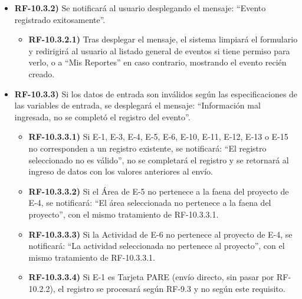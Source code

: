 \begin{itemize}[label={}, leftmargin=1.5em]
\begin{itemize}[label={}, leftmargin=1.5em]
\begin{itemize}[label={}, leftmargin=1.5em]
      \item \textbf{RF-10.3.1.1)} Si E-16 contiene archivos, el sistema invoca autom\'aticamente RF-12 (Registrar evidencias de evento), enviando el ID del evento creado, los archivos de E-16 y el origen \texttt{reporte}.
      \item \textbf{RF-10.3.1.2)} Si RF-12 notifica un fallo, el sistema revertir\'a la creaci\'on del evento (rollback), notificar\'a: ``No se pudo completar el registro, intente nuevamente'' y retornar\'a al ingreso de datos con los valores anteriores al env\'io.
    \end{itemize}
    \item \textbf{RF-10.3.2)} Se notificar\'a al usuario desplegando el mensaje: ``Evento registrado exitosamente''.
    \begin{itemize}[label={}, leftmargin=1.5em]
      \item \textbf{RF-10.3.2.1)} Tras desplegar el mensaje, el sistema limpiar\'a el formulario y redirigir\'a al usuario al listado general de eventos si tiene permiso para verlo, o a ``Mis Reportes'' en caso contrario, mostrando el evento reci\'en creado.
    \end{itemize}
    \item \textbf{RF-10.3.3)} Si los datos de entrada son inv\'alidos seg\'un las especificaciones de las variables de entrada, se desplegar\'a el mensaje: ``Informaci\'on mal ingresada, no se complet\'o el registro del evento''.
    \begin{itemize}[label={}, leftmargin=1.5em]
      \item \textbf{RF-10.3.3.1)} Si E-1, E-3, E-4, E-5, E-6, E-10, E-11, E-12, E-13 o E-15 no corresponden a un registro existente, se notificar\'a: ``El registro seleccionado no es v\'alido'', no se completar\'a el registro y se retornar\'a al ingreso de datos con los valores anteriores al env\'io.
      \item \textbf{RF-10.3.3.2)} Si el \'Area de E-5 no pertenece a la faena del proyecto de E-4, se notificar\'a: ``El \'area seleccionada no pertenece a la faena del proyecto'', con el mismo tratamiento de RF-10.3.3.1.
      \item \textbf{RF-10.3.3.3)} Si la Actividad de E-6 no pertenece al proyecto de E-4, se notificar\'a: ``La actividad seleccionada no pertenece al proyecto'', con el mismo tratamiento de RF-10.3.3.1.
      \item \textbf{RF-10.3.3.4)} Si E-1 es Tarjeta PARE (env\'io directo, sin pasar por RF-10.2.2), el registro se procesar\'a seg\'un RF-9.3 y no seg\'un este requisito.

\end{itemize}
\end{itemize}
\end{itemize}
